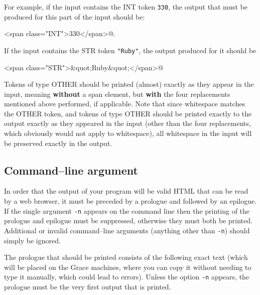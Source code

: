 \documentclass[11pt]{article}
\begin{document}
      \bigskip\medskip

      For example, if the input contains the INT token \texttt{330}, the
    output that must be produced for this part of the input should be:

      \begin{centering}

        \verb@<span class="INT">330</span>@.

      \end{centering}

      \medskip\smallskip

      If the input contains the STR token \texttt{"Ruby"}, the output produced
    for it should be

      \medskip

      \begin{centering}

        \verb@<span class="STR">&quot;Ruby&quot;</span>@

      \end{centering}

      \medskip\smallskip

      Tokens of type OTHER should be printed (almost) exactly as they appear
    in the input, meaning \textbf{without} a span element, but \textbf{with}
    the four replacements mentioned above performed, if applicable.  Note
    that since whitespace matches the OTHER token, and tokens of type OTHER
    should be printed exactly to the output exactly as they appeared in the
    input (other than the four replacements, which obviously would not apply
    to whitespace), all whitespace in the input will be preserved exactly in
    the output.

    \subsection{Command--line argument}

      In order that the output of your program will be valid HTML that can be
    read by a web browser, it must be preceded by a prologue and followed by
    an epilogue.  If the single argument \texttt{-n} appears on the
    command line then the printing of the prologue and epilogue
    must be suppressed, otherwise they must both be printed.  Additional or
    invalid command--line arguments (anything other than \texttt{-n}) should
    simply be ignored.

      The prologue that should be printed consists of the following exact text
    (which will be placed on the Grace machines, where you can copy it
    without needing to type it manually, which could lead to errors).  Unless
    the option \texttt{-n} appears, the prologue must be the very first
    output that is printed.
\end{document}
